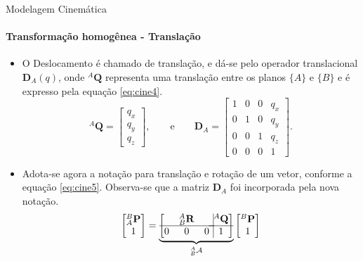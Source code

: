 \documentclass{beamer}
\begin{document}
\begin{frame}{Modelagem Cinemática}
    \framesubtitle{Transformação homogênea - Translação}
    \begin{itemize}
        \item O Deslocamento é chamado de translação, e dá-se pelo operador translacional $\mathbf{D}_A(q)$, onde ${}^A\mathbf{Q}$ representa uma translação entre os planos $\{A\}$ e $\{B\}$ e é expresso pela equação \eqref{eq:cine4}.
        \begin{equation}\label{eq:cine4}
        {}^A\mathbf{Q} =
        \begin{bmatrix}
        q_x\\ q_y \\ q_z
        \end{bmatrix}, \qquad \mathrm{e} \qquad
        \mathbf{D}_A = 
        \begin{bmatrix}
        1 & 0 & 0 & q_x\\
        0 & 1 & 0 & q_y\\
        0 & 0 & 1 & q_z\\
        0 & 0 & 0 & 1
        \end{bmatrix}.
        \end{equation}
    \item Adota-se agora a notação para translação e rotação de um vetor, conforme a equação \eqref{eq:cine5}. Observa-se que a matriz $\mathbf{D}_A$ foi incorporada pela nova notação.
        \begin{equation}\label{eq:cine5}
        \begin{bmatrix}
        {}^B_A\mathbf{P}\\ 1
        \end{bmatrix}
        =
        \underbrace {
        \left[
        \begin{matrix}
        & {}_B^A\mathbf{R}& \\ \hline
        0 & 0 & 0\\
        \end{matrix} \right.
        \left.
        \vline
        \begin{matrix}
        {}^A\mathbf{Q}\\ \hline
        1
        \end{matrix} \right]
        }_{{}^A_B\mathcal{A}}
        \begin{bmatrix}
        {}^B\mathbf{P}\\
        1
        \end{bmatrix}
        \end{equation}
    \end{itemize}
\end{frame}
\end{document}

